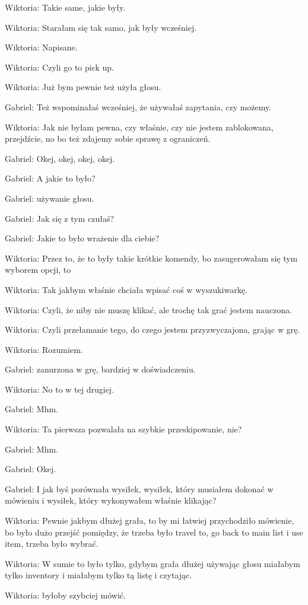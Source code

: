 Wiktoria: Takie same, jakie były.

Wiktoria: Starałam się tak samo, jak były wcześniej.

Wiktoria: Napisane.

Wiktoria: Czyli go to pick up.

Wiktoria: Już bym pewnie też użyła głosu.

Gabriel: Też wspominałaś wcześniej, że używałaś zapytania, czy możemy.

Wiktoria: Jak nie byłam pewna, czy właśnie, czy nie jestem zablokowana, przejdźcie, no bo też zdajemy sobie sprawę z ograniczeń.

Gabriel: Okej, okej, okej, okej.

Gabriel: A jakie to było?

Gabriel: używanie głosu.

Gabriel: Jak się z tym czułaś?

Gabriel: Jakie to było wrażenie dla ciebie?

Wiktoria: Przez to, że to były takie krótkie komendy, bo zasugerowałam się tym wyborem opcji, to

Wiktoria: Tak jakbym właśnie chciała wpisać coś w wyszukiwarkę.

Wiktoria: Czyli, że niby nie muszę klikać, ale trochę tak grać jestem nauczona.

Wiktoria: Czyli przełamanie tego, do czego jestem przyzwyczajona, grając w grę.

Wiktoria: Rozumiem.

Gabriel: zanurzona w grę, bardziej w doświadczeniu.

Wiktoria: No to w tej drugiej.

Gabriel: Mhm.

Wiktoria: Ta pierwsza pozwalała na szybkie przeskipowanie, nie?

Gabriel: Mhm.

Gabriel: Okej.

Gabriel: I jak byś porównała wysiłek, wysiłek, który musiałem dokonać w mówieniu i wysiłek, który wykonywałem właśnie klikając?

Wiktoria: Pewnie jakbym dłużej grała, to by mi łatwiej przychodziło mówienie, bo było dużo przejść pomiędzy, że trzeba było travel to, go back to main list i use item, trzeba było wybrać.

Wiktoria: W sumie to było tylko, gdybym grała dłużej używając głosu miałabym tylko inventory i miałabym tylko tą listę i czytając.

Wiktoria: byłoby szybciej mówić.

